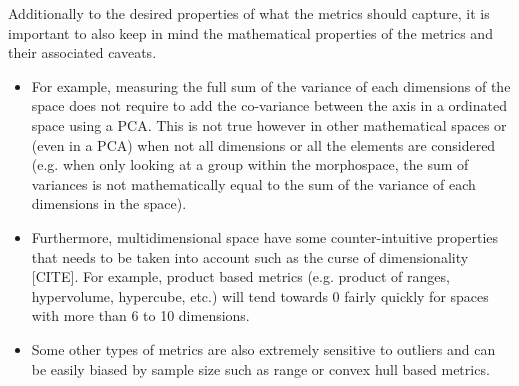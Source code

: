 \documentclass[12pt,letterpaper]{article}
\begin{document}
Additionally to the desired properties of what the metrics should capture, it is important to also keep in mind the mathematical properties of the metrics and their associated caveats.

\begin{itemize} %
    \item For example, measuring the full sum of the variance of each dimensions of the space does not require to add the co-variance between the axis in a ordinated space using a PCA.
    This is not true however in other mathematical spaces or (even in a PCA) when not all dimensions or all the elements are considered (e.g. when only looking at a group within the morphospace, the sum of variances is not mathematically equal to the sum of the variance of each dimensions in the space).

    \item Furthermore, multidimensional space have some counter-intuitive properties that needs to be taken into account such as the curse of dimensionality [CITE].
    For example, product based metrics (e.g. product of ranges, hypervolume, hypercube, etc.) will tend towards 0 fairly quickly for spaces with more than 6 to 10 dimensions.

    \item Some other types of metrics are also extremely sensitive to outliers and can be easily biased by sample size such as range or convex hull based metrics.

\end{itemize}

\end{document}
